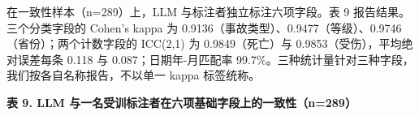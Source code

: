 \documentclass[11pt]{article}
\begin{document}
{\cjkfont 在\allowbreak 一\allowbreak 致\allowbreak 性\allowbreak 样\allowbreak 本\allowbreak （}n=289{\cjkfont ）\allowbreak 上\allowbreak ，}LLM {\cjkfont 与\allowbreak 标\allowbreak 注\allowbreak 者\allowbreak 独\allowbreak 立\allowbreak 标\allowbreak 注\allowbreak 六\allowbreak 项\allowbreak 字\allowbreak 段\allowbreak 。\allowbreak 表} 9 {\cjkfont 报\allowbreak 告\allowbreak 结\allowbreak 果\allowbreak 。\allowbreak 三\allowbreak 个\allowbreak 分\allowbreak 类\allowbreak 字\allowbreak 段\allowbreak 的} Cohen's kappa {\cjkfont 为} 0.9136{\cjkfont （\allowbreak 事\allowbreak 故\allowbreak 类\allowbreak 型\allowbreak ）\allowbreak 、}0.9477{\cjkfont （\allowbreak 等\allowbreak 级\allowbreak ）\allowbreak 、}0.9746{\cjkfont （\allowbreak 省\allowbreak 份\allowbreak ）\allowbreak ；\allowbreak 两\allowbreak 个\allowbreak 计\allowbreak 数\allowbreak 字\allowbreak 段\allowbreak 的} ICC(2,1) {\cjkfont 为} 0.9849{\cjkfont （\allowbreak 死\allowbreak 亡\allowbreak ）\allowbreak 与} 0.9853{\cjkfont （\allowbreak 受\allowbreak 伤\allowbreak ）\allowbreak ，\allowbreak 平\allowbreak 均\allowbreak 绝\allowbreak 对\allowbreak 误\allowbreak 差\allowbreak 每\allowbreak 条} 0.118 {\cjkfont 与} 0.087{\cjkfont ；\allowbreak 日\allowbreak 期\allowbreak 年}-{\cjkfont 月\allowbreak 匹\allowbreak 配\allowbreak 率} 99.7\%{\cjkfont 。\allowbreak 三\allowbreak 种\allowbreak 统\allowbreak 计\allowbreak 量\allowbreak 针\allowbreak 对\allowbreak 三\allowbreak 种\allowbreak 字\allowbreak 段\allowbreak ，\allowbreak 我\allowbreak 们\allowbreak 按\allowbreak 各\allowbreak 自\allowbreak 名\allowbreak 称\allowbreak 报\allowbreak 告\allowbreak ，\allowbreak 不\allowbreak 以\allowbreak 单\allowbreak 一} kappa {\cjkfont 标\allowbreak 签\allowbreak 统\allowbreak 称\allowbreak 。}

\textbf{{\cjkfont 表} 9. LLM {\cjkfont 与\allowbreak 一\allowbreak 名\allowbreak 受\allowbreak 训\allowbreak 标\allowbreak 注\allowbreak 者\allowbreak 在\allowbreak 六\allowbreak 项\allowbreak 基\allowbreak 础\allowbreak 字\allowbreak 段\allowbreak 上\allowbreak 的\allowbreak 一\allowbreak 致\allowbreak 性\allowbreak （}n=289{\cjkfont ）}}
\end{document}

